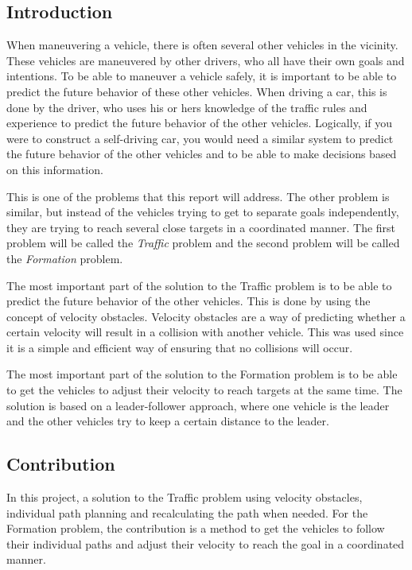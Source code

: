\documentclass[a4paper,12pt]{article}
\begin{document}
\begin{multicols}{2}

\section{Introduction}
\label{sec:intro}

When maneuvering a vehicle, there is often several other vehicles in the vicinity. These vehicles are maneuvered by other drivers, who all have their own goals and intentions. To be able to maneuver a vehicle safely, it is important to be able to predict the future behavior of these other vehicles. When driving a car, this is done by the driver, who uses his or hers knowledge of the traffic rules and experience to predict the future behavior of the other vehicles. Logically, if you were to construct a self-driving car, you would need a similar system to predict the future behavior of the other vehicles and to be able to make decisions based on this information. 

This is one of the problems that this report will address. The other problem is similar, but instead of the vehicles trying to get to separate goals independently, they are trying to reach several close targets in a coordinated manner. The first problem will be called the \emph{Traffic} problem and the second problem will be called the \emph{Formation} problem.

The most important part of the solution to the Traffic problem is to be able to predict the future behavior of the other vehicles. This is done by using the concept of velocity obstacles. Velocity obstacles are a way of predicting whether a certain velocity will result in a collision with another vehicle. This was used since it is a simple and efficient way of ensuring that no collisions will occur.

The most important part of the solution to the Formation problem is to be able to get the vehicles to adjust their velocity to reach targets at the same time. The solution is based on a leader-follower approach, where one vehicle is the leader and the other vehicles try to keep a certain distance to the leader.



\subsection{Contribution}
In this project, a solution to the Traffic problem using velocity obstacles, individual path planning and recalculating the path when needed. For the Formation problem, the contribution is a method to get the vehicles to follow their individual paths and adjust their velocity to reach the goal in a coordinated manner.


\end{multicols}
\end{document}
